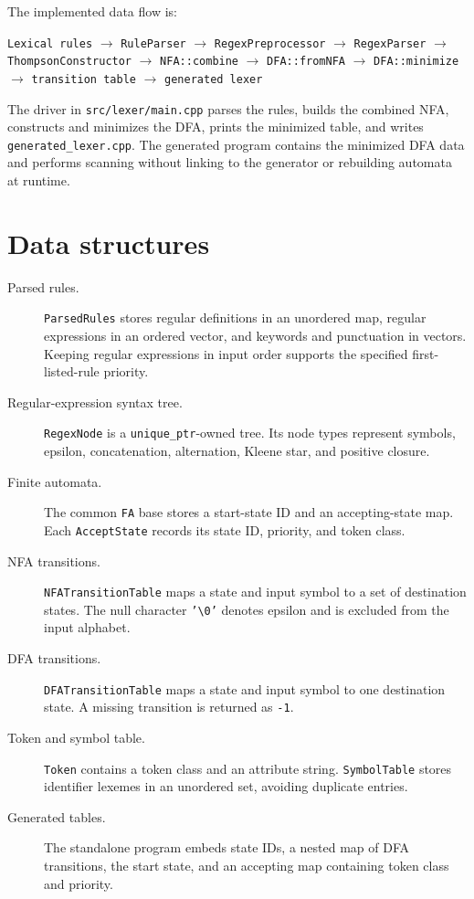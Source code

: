 \documentclass[11pt,a4paper]{article}
\newcommand{\code}[1]{\texttt{#1}}
\begin{document}
The implemented data flow is:

\begin{center}
\code{Lexical rules}
$\rightarrow$ \code{RuleParser}
$\rightarrow$ \code{RegexPreprocessor}
$\rightarrow$ \code{RegexParser}
$\rightarrow$ \code{ThompsonConstructor}
$\rightarrow$ \code{NFA::combine}
$\rightarrow$ \code{DFA::fromNFA}
$\rightarrow$ \code{DFA::minimize}
$\rightarrow$ \code{transition table}
$\rightarrow$ \code{generated lexer}
\end{center}

The driver in \code{src/lexer/main.cpp} parses the rules, builds the
combined NFA, constructs and minimizes the DFA, prints the minimized
table, and writes \code{generated\_lexer.cpp}. The generated program
contains the minimized DFA data and performs scanning without linking to
the generator or rebuilding automata at runtime.

\section{Data structures}

\begin{description}
    \item[Parsed rules.] \code{ParsedRules} stores regular definitions in
    an unordered map, regular expressions in an ordered vector, and
    keywords and punctuation in vectors. Keeping regular expressions in
    input order supports the specified first-listed-rule priority.
    \item[Regular-expression syntax tree.] \code{RegexNode} is a
    \code{unique\_ptr}-owned tree. Its node types represent symbols,
    epsilon, concatenation, alternation, Kleene star, and positive
    closure.
    \item[Finite automata.] The common \code{FA} base stores a start-state
    ID and an accepting-state map. Each \code{AcceptState} records its
    state ID, priority, and token class.
    \item[NFA transitions.] \code{NFATransitionTable} maps a state and
    input symbol to a set of destination states. The null character
    \code{'\textbackslash 0'} denotes epsilon and is excluded from the
    input alphabet.
    \item[DFA transitions.] \code{DFATransitionTable} maps a state and
    input symbol to one destination state. A missing transition is
    returned as \code{-1}.
    \item[Token and symbol table.] \code{Token} contains a token class
    and an attribute string. \code{SymbolTable} stores identifier
    lexemes in an unordered set, avoiding duplicate entries.
    \item[Generated tables.] The standalone program embeds state IDs,
    a nested map of DFA transitions, the start state, and an accepting
    map containing token class and priority.
\end{description}
\end{document}
